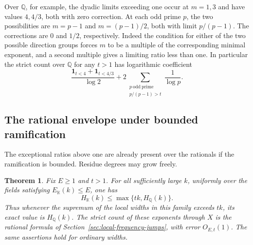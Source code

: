 \documentclass[11pt,letterpaper]{article}
\newtheorem{theorem}{Theorem}[section]
\theoremstyle{definition}
\numberwithin{equation}{section}
\begin{document}
Over $\mathbb Q$, for example, the dyadic limits exceeding one occur
at $m=1,3$ and have values $4,4/3$, both with zero correction.
At each odd prime $p$, the two possibilities are $m=p-1$ and
$m=(p-1)/2$, both with limit $p/(p-1)$. The corrections are $0$
and $1/2$, respectively. Indeed the condition for either of the two
possible direction groups forces $m$ to be a multiple of the
corresponding minimal exponent, and a second multiple gives a
limiting ratio less than one. In particular the strict count over
$\mathbb Q$ for any $t>1$ has logarithmic coefficient
\[
 \frac{\mathbf1_{t<4}+\mathbf1_{t<4/3}}{\log2}
       + 2\sum_{\substack{p\ \mathrm{odd\ prime}\\p/(p-1)>t}}
                                                     \frac1{\log p}.
\]

\subsection{The rational envelope under bounded ramification}
\label{sec:rational-envelope}
The exceptional ratios above one are already present over the rationals
if the ramification is bounded. Residue degrees may grow freely.
\begin{theorem}\label{thm:rational-envelope}
Fix $E\ge1$ and $t>1$. For all sufficiently large $k$, uniformly over
the fields satisfying $E_{\mathbb K}(k)\le E$, one has
\[
        H_{\mathbb K}(k)\le\max\{tk,H_{\mathbb Q}(k)\}.
\]
Thus whenever the supremum of the local widths in this family exceeds
$tk$, its exact value is $H_{\mathbb Q}(k)$. The strict count of these
exponents through $X$ is the rational formula of
Section~\ref{sec:local-frequency-jumps}, with error $O_{E,t}(1)$.
The same assertions hold for ordinary widths.
\end{theorem}
\end{document}
